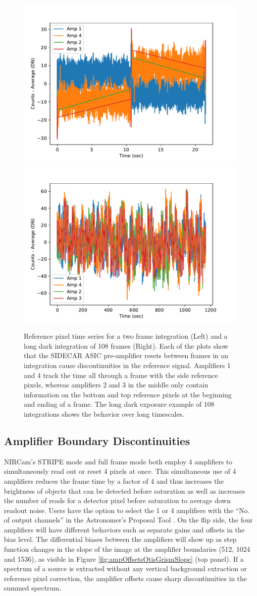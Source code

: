 \documentclass[]{aastex62}
\begin{document}
\begin{figure}[!hbtp]
\centering
\includegraphics[width=.49\columnwidth]{allamps.pdf}
\includegraphics[width=.49\columnwidth]{allamps_long_dark.pdf}
\caption{Reference pixel time series for a two frame integration (Left) and a long dark integration of 108 frames (Right). Each of the plots show that the SIDECAR ASIC pre-amplifier resets between frames in an integration cause discontinuities in the reference signal. Amplifiers 1 and 4 track the time all through a frame with the side reference pixels, whereas amplifiers 2 and 3 in the middle only contain information on the bottom and top reference pixels at the beginning and ending of a frame.
The long dark exposure example of 108 integrations shows the behavior over long timescales.}\label{fig:ampResetDark}
\end{figure}

\subsection{Amplifier Boundary Discontinuities}

NIRCam's STRIPE mode and full frame mode both employ 4 amplifiers to simultaneously read out or reset 4 pixels at once.
This simultaneous use of 4 amplifiers reduces the frame time by a factor of 4 and thus increases the brightness of objects that can be detected before saturation as well as increases the number of reads for a detector pixel before saturation to average down readout noise.
Users have the option to select the 1 or 4 amplifiers with the ``No. of output channels'' in the Astronomer's Proposal Tool \citep[APT][]{apt2020p2}.
On the flip side, the four amplifiers will have different behaviors such as separate gains and offsets in the bias level.
The differential biases between the amplifiers will show up as step function changes in the slope of the image at the amplifier boundaries (512, 1024 and 1536), as visible in Figure \ref{fig:ampOffsetsOtisGrismSlope} (top panel).
If a spectrum of a source is extracted without any vertical background extraction or reference pixel correction, the amplifier offsets cause sharp discontinuities in the summed spectrum.
\end{document}
